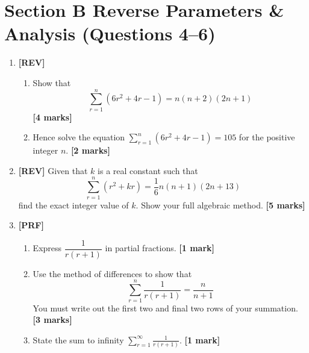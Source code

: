 \documentclass[11pt,a4paper]{article}
\begin{document}
\section*{Section B \quad Reverse Parameters \& Analysis \hfill{\normalfont\footnotesize(Questions 4--6)}}
\begin{enumerate}[resume]

\item \textbf{[REV]} 
\begin{enumerate}[label=(\alph*)]
  \item Show that
  \[
  \sum_{r=1}^n (6r^2 + 4r - 1) = n(n+2)(2n+1)
  \]
  \hfill{\textbf{[4 marks]}}
  \item Hence solve the equation $\displaystyle\sum_{r=1}^n (6r^2 + 4r - 1) = 105$ for the positive integer $n$. \hfill{\textbf{[2 marks]}}
\end{enumerate}

\item \textbf{[REV]} Given that $k$ is a real constant such that
\[
\sum_{r=1}^n (r^2 + kr) = \frac{1}{6}n(n+1)(2n + 13)
\]
find the exact integer value of $k$. Show your full algebraic method. \hfill{\textbf{[5 marks]}}

\item \textbf{[PRF]} 
\begin{enumerate}[label=(\alph*)]
  \item Express $\dfrac{1}{r(r+1)}$ in partial fractions. \hfill{\textbf{[1 mark]}}
  \item Use the method of differences to show that
  \[
  \sum_{r=1}^n \frac{1}{r(r+1)} = \frac{n}{n+1}
  \]
  You must write out the first two and final two rows of your summation. \hfill{\textbf{[3 marks]}}
  \item State the sum to infinity $\displaystyle\sum_{r=1}^\infty \frac{1}{r(r+1)}$. \hfill{\textbf{[1 mark]}}
\end{enumerate}

\end{enumerate}
\end{document}
